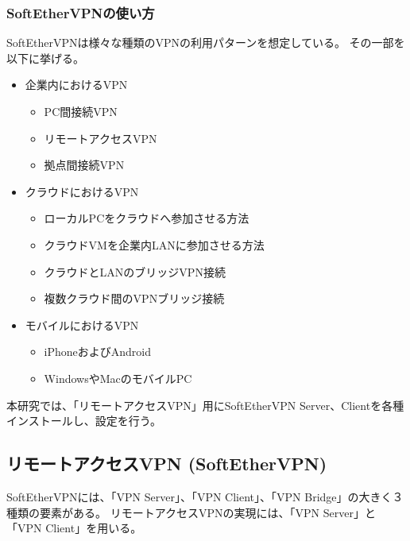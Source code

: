 \documentclass[11pt,a4j,titlepage]{jreport}
\begin{document}
\subsubsection{SoftEtherVPNの使い方}
SoftEtherVPNは様々な種類のVPNの利用パターンを想定している。
その一部を以下に挙げる。

\begin{itemize}
    \setlength{\parskip}{0.05cm} %
    \setlength{\itemsep}{0.05cm}
    \item 企業内におけるVPN
    \begin{itemize}
        \item PC間接続VPN
        \item リモートアクセスVPN
        \item 拠点間接続VPN
    \end{itemize}
    \item クラウドにおけるVPN
    \begin{itemize}
        \item ローカルPCをクラウドへ参加させる方法
        \item クラウドVMを企業内LANに参加させる方法
        \item クラウドとLANのブリッジVPN接続
        \item 複数クラウド間のVPNブリッジ接続
    \end{itemize}
    \item モバイルにおけるVPN
    \begin{itemize}
        \item iPhoneおよびAndroid
        \item WindowsやMacのモバイルPC
    \end{itemize}
\end{itemize}


本研究では、「リモートアクセスVPN」用にSoftEtherVPN Server、Clientを各種インストールし、設定を行う。

\subsection{リモートアクセスVPN (SoftEtherVPN)}
SoftEtherVPNには、「VPN Server」、「VPN Client」、「VPN Bridge」の大きく３種類の要素がある。
リモートアクセスVPNの実現には、「VPN Server」と「VPN Client」を用いる。
\end{document}
